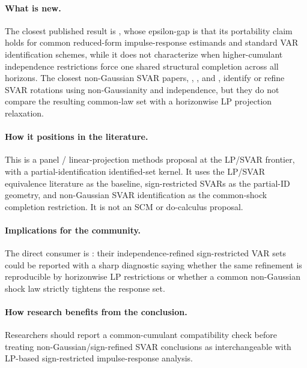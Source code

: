 \documentclass[11pt]{article}
\theoremstyle{definition}
\theoremstyle{plain}
\theoremstyle{remark}
\begin{document}
\paragraph{What is new.}
The closest published result is \citet{PlagborgMollerWolf2021}, whose epsilon-gap is that its portability claim holds for common reduced-form impulse-response estimands and standard VAR identification schemes, while it does not characterize when higher-cumulant independence restrictions force one shared structural completion across all horizons.  The closest non-Gaussian SVAR papers, \citet{GourierouxMonfortRenne2017}, \citet{LanneMeitzSaikkonen2017}, and \citet{DrautzburgWright2023}, identify or refine SVAR rotations using non-Gaussianity and independence, but they do not compare the resulting common-law set with a horizonwise LP projection relaxation.

\paragraph{How it positions in the literature.}
This is a panel / linear-projection methods proposal at the LP/SVAR frontier, with a partial-identification identified-set kernel.  It uses the LP/SVAR equivalence literature as the baseline, sign-restricted SVARs as the partial-ID geometry, and non-Gaussian SVAR identification as the common-shock completion restriction.  It is not an SCM or do-calculus proposal.

\paragraph{Implications for the community.}
The direct consumer is \citet{DrautzburgWright2023}: their independence-refined sign-restricted VAR sets could be reported with a sharp diagnostic saying whether the same refinement is reproducible by horizonwise LP restrictions or whether a common non-Gaussian shock law strictly tightens the response set.

\paragraph{How research benefits from the conclusion.}
Researchers should report a common-cumulant compatibility check before treating non-Gaussian/sign-refined SVAR conclusions as interchangeable with LP-based sign-restricted impulse-response analysis.
\end{document}
